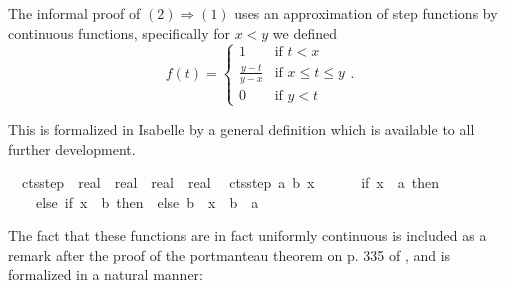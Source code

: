 \documentclass[leqno]{article}
\theoremstyle{definition}
\begin{document}
\medskip

The informal proof of $(2) \Longrightarrow (1)$ uses an approximation of step functions by continuous functions, specifically for $x < y$ we defined
\[ f(t) = \begin{cases} 1 & \text{if $t < x$} \\
                        \frac{y - t}{y - x} & \text{if $x \le t \le y$} \\
                        0 & \text{if $y < t$} \end{cases}. \]

This is formalized in Isabelle by a general definition which is available to all further development.

\newpage

\begin{isabellebody}
\isamarkupfalse%
\isanewline
\ \ cts{\isacharunderscore}step\ {\isacharcolon}{\isacharcolon}\ {\isachardoublequoteopen}real\ {\isasymRightarrow}\ real\ {\isasymRightarrow}\ real\ {\isasymRightarrow}\ real{\isachardoublequoteclose}\isanewline
{}\isanewline
\ \ {\isachardoublequoteopen}cts{\isacharunderscore}step\ a\ b\ x\ {\isasymequiv}\ \isanewline
\ \ \ \ if\ x\ {\isasymle}\ a\ then\ {}\isanewline
\ \ \ \ else\ {\isacharparenleft}if\ x\ {\isasymge}\ b\ then\ {}\ else\ {\isacharparenleft}b\ {\isacharminus}\ x{\isacharparenright}\ {\isacharslash}\ {\isacharparenleft}b\ {\isacharminus}\ a{\isacharparenright}{\isacharparenright}{\isachardoublequoteclose}
\end{isabellebody}

\medskip

The fact that these functions are in fact uniformly continuous is included as a remark after the proof of the portmanteau theorem on p. 335 of \cite{billingsley}, and is formalized in a natural manner:

\medskip
\end{document}
